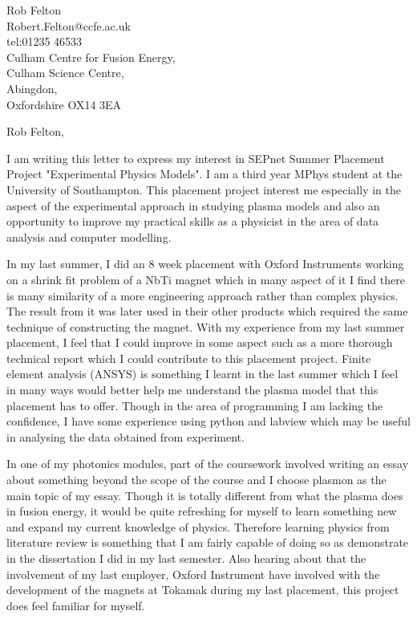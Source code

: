 \documentclass[11pt]{letter} %
\begin{document}

\begin{letter}{Rob Felton\\Robert.Felton@ccfe.ac.uk\\tel:01235 46533\\Culham Centre for Fusion Energy,\\Culham Science Centre,\\Abingdon,\\Oxfordshire OX14 3EA}


\opening{Rob Felton,} 

I am writing this letter to express my interest in SEPnet Summer Placement Project "Experimental Physics Models". I am a third year MPhys student at the University of Southampton. This placement project interest me especially in the aspect of the  experimental approach in studying plasma models and also an opportunity to improve my practical skills as a physicist in the area of data analysis and computer modelling.

In my last summer, I did an 8 week placement with Oxford Instruments working on a shrink fit problem of a NbTi magnet which in many aspect of it I find there is many similarity of a more engineering approach rather than complex physics. The result from it was later used in their other products which required the same technique of constructing the magnet. With my experience from my last summer placement, I feel that I could improve in some aspect such as a more thorough technical report which I could contribute to this placement project. Finite element analysis (ANSYS) is something I learnt in the last summer which I feel in many ways would better help me understand the plasma model that this placement has to offer. Though in the area of programming I am lacking the confidence, I have some experience using python and labview which may be useful in analysing the data obtained from experiment.

In one of my photonics modules, part of the coursework involved writing an essay about something beyond the scope of the course and I choose plasmon as the main topic of my essay. Though it is totally different from what the plasma does in fusion energy, it would be quite refreshing for myself to learn something new and expand my current knowledge of physics. Therefore learning physics from literature review is something that I am fairly capable of doing so as demonstrate in the dissertation I did in my last semester. Also hearing about that the involvement of my last employer, Oxford Instrument have involved with the development of the magnets at Tokamak during my last placement, this project does feel familiar for myself.


\end{letter}
\end{document}
